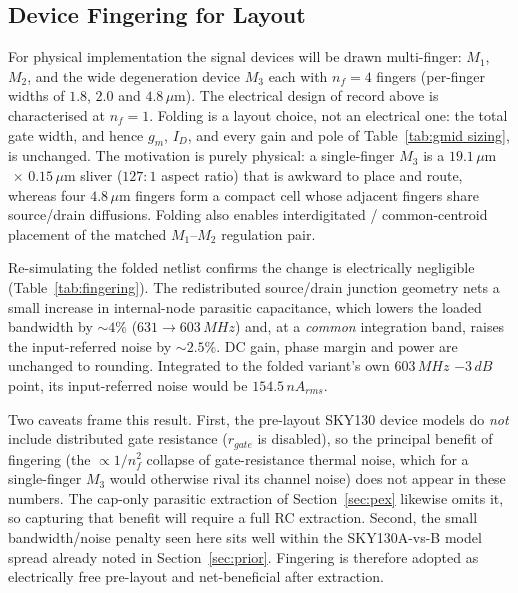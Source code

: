 \documentclass{article}
\begin{document}
\subsection{Device Fingering for Layout}
\label{sec:fingering}
For physical implementation the signal devices will be drawn multi-finger: $M_1$, $M_2$, and the
wide degeneration device $M_3$ each with $n_f=4$ fingers (per-finger widths of
$1.8$, $2.0$ and $4.8\,\mu$m). The electrical design of record above is characterised at
$n_f=1$. Folding is a layout choice, not an electrical one: the total gate width, and hence
$g_m$, $I_D$, and every gain and pole of Table~\ref{tab:gmid sizing}, is unchanged. The motivation is purely physical: a single-finger $M_3$ is a
$19.1\,\mu$m$\,\times\,0.15\,\mu$m sliver ($127{:}1$ aspect ratio) that is awkward to place and
route, whereas four $4.8\,\mu$m fingers form a compact cell whose adjacent fingers
share source/drain diffusions. Folding also enables interdigitated / common-centroid placement
of the matched $M_1$--$M_2$ regulation pair.

Re-simulating the folded netlist confirms the change is electrically negligible
(Table~\ref{tab:fingering}). The redistributed source/drain junction geometry nets a small
increase in internal-node parasitic capacitance, which lowers the loaded bandwidth by $\sim4\%$
($631\rightarrow603\,MHz$) and, at a \emph{common} integration band, raises the input-referred
noise by $\sim2.5\%$. DC gain, phase margin and power are unchanged to rounding. Integrated to
the folded variant's own $603\,MHz$ $-3\,dB$ point, its input-referred noise would be
$154.5\,nA_{rms}$.

Two caveats frame this result. First, the pre-layout SKY130 device models do \emph{not} include
distributed gate resistance ($r_{gate}$ is disabled), so the principal benefit of fingering
(the $\propto 1/n_f^2$ collapse of gate-resistance thermal noise, which for a single-finger $M_3$
would otherwise rival its channel noise) does not appear in these numbers. The cap-only
parasitic extraction of Section~\ref{sec:pex} likewise omits it, so capturing that benefit will
require a full RC extraction. Second, the small bandwidth/noise
penalty seen here sits well within the SKY130A-vs-B model spread already noted in
Section~\ref{sec:prior}. Fingering is therefore adopted as electrically free pre-layout and
net-beneficial after extraction.
\end{document}
